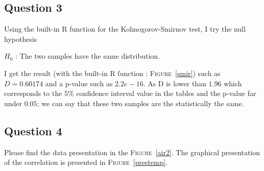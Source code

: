 \documentclass[12pt,a4paper]{article}
\begin{document}
\subsection*{Question 3}
Using the built-in R function for the Kolmogorov-Smirnov test, I try the null hypothesis
\begin{center}$H_0$ : The two samples have the same distribution.\end{center}

I get the result (with the built-in R function : \textsc{Figure}~\ref{smir}) such as $D = 0.60174$ and a p-value such as $2.2e-16$. As D is lower than $1.96$ which corresponds to the $5\%$ confidence interval value in the tables and the p-value far under $0.05$; we can say that these two samples are the statistically the same.\\

\subsection*{Question 4}
Please find the data presentation in the \textsc{Figure}~\ref{air2}. The graphical presentation of the correlation is presented in \textsc{Figure}~\ref{prestemp}.
\end{document}
